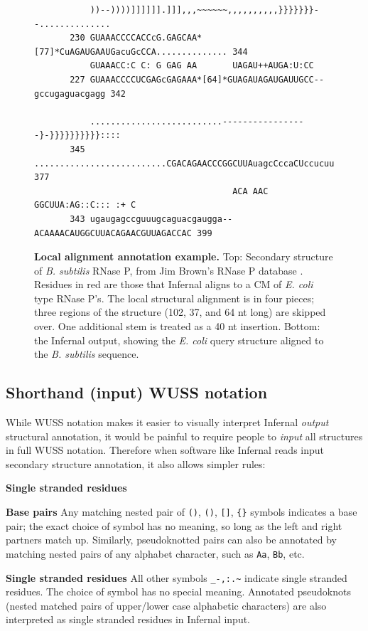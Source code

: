 \begin{figure}[tp]
\begin{center}
{\begin{BVerbatim}
           ))--))))]]]]]].]]],,,~~~~~~,,,,,,,,,,}}}}}}}--..............
       230 GUAAACCCCACCcG.GAGCAA*[77]*CuAGAUGAAUGacuGcCCA.............. 344
           GUAAACC:C C: G GAG AA       UAGAU++AUGA:U:CC
       227 GUAAACCCCUCGAGcGAGAAA*[64]*GUAGAUAGAUGAUUGCC--gccugaguacgagg 342

           ..........................-----------------}-}}}}}}}}}}::::
       345 ..........................CGACAGAACCCGGCUUAuagcCccaCUccucuu 377
                                       ACA AAC  GGCUUA:AG::C::: :+ C
       343 ugaugagccguuugcaguacgaugga--ACAAAACAUGGCUUACAGAACGUUAGACCAC 399
\end{BVerbatim}
}
\end{center}
\caption{\small \textbf{Local alignment annotation example.} Top:
Secondary structure of \emph{B. subtilis} RNase P, from Jim Brown's
RNase P database \citep{Brown99}. Residues in red are those that
Infernal aligns to a CM of \emph{E. coli} type RNase
P's. The local structural alignment is in four pieces; three regions
of the structure (102, 37, and 64 nt long) are skipped over. One
additional stem is treated as a 40 nt insertion. Bottom: the
Infernal output, showing the \emph{E. coli} query structure
aligned to the \emph{B. subtilis} sequence.}
\label{fig:bsu-alignment}
\end{figure}

\subsection{Shorthand (input) WUSS notation}

While WUSS notation makes it easier to visually interpret Infernal
\emph{output} structural annotation, it would be painful to require
people to \emph{input} all structures in full WUSS notation. Therefore
when software like Infernal reads input secondary structure
annotation, it also allows simpler rules:

\begin{sreitems}{\textbf{Single stranded residues}}
\item [\textbf{Base pairs}]
  Any matching nested pair of \verb+()+, \verb+()+, \verb+[]+, \verb+{}+
  symbols indicates a base pair; the exact choice of symbol has no
  meaning, so long as the left and right partners match up.
  Similarly, pseudoknotted pairs can also be annotated by matching nested
  pairs of any alphabet character, such as \verb+Aa+, \verb+Bb+, etc.

\item [\textbf{Single stranded residues}]
  All other symbols \verb+_-,:.~+
  indicate single stranded residues.
  The choice of symbol has no special meaning.
  Annotated pseudoknots (nested matched pairs of upper/lower case
  alphabetic characters) are also interpreted as single
  stranded residues in Infernal input.
\end{sreitems}


